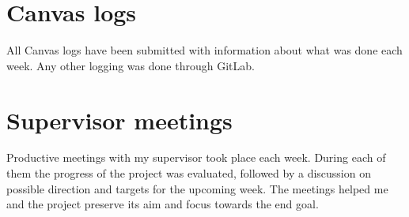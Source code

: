 \section{Canvas logs} 
\label{sec:canvaslogs}
All Canvas logs have been submitted with information about what was done
each week. Any other logging was done through GitLab.

\section{Supervisor meetings}
\label{sec:supervisor}
Productive meetings with my supervisor took place each week. During each of them
the progress of the project was evaluated, followed by a discussion on possible
direction and targets for the upcoming week. The meetings helped me and the
project preserve its aim and focus towards the end goal.